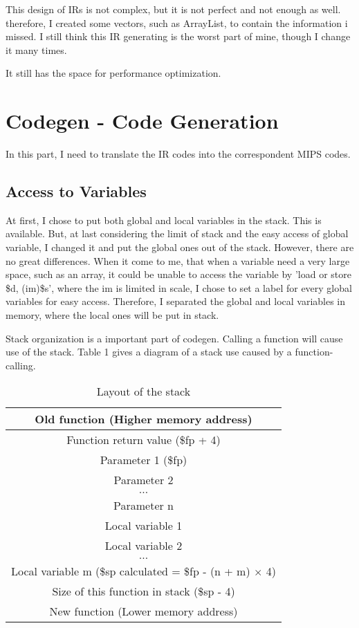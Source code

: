 \documentclass[preprint, 9pt]{sigplanconf}
\begin{document}
    This design of IRs is not complex, but it is not perfect and not enough as well.
    therefore, I created some vectors, such as ArrayList, to contain the information i missed.
    I still think this IR generating is the worst part of mine, though I change it many times.

    It still has the space for performance optimization.

\section{Codegen - Code Generation}

    In this part, I need to translate the IR codes into the correspondent MIPS codes.

    \subsection{Access to Variables}
    At first, I chose to put both global and local variables in the stack.
    This is available.
    But, at last considering the limit of stack and the easy access of global variable, I changed it and put the global ones out of the stack.
    However, there are no great differences.
    When it come to me, that when a variable need a very large space, such as an array, it could be unable to access the variable by 'load or store \$d, (im)\$s', where the im is limited in scale, I chose to set a label for every global variables for easy access.
    Therefore, I separated the global and local variables in memory, where the local ones will be put in stack.

    Stack organization is a important part of codegen.
    Calling a function will cause use of the stack.
    Table 1 gives a diagram of a stack use caused by a function-calling.

\begin{table}[htbp]
  \centering
  \caption{Layout of the stack}
    \begin{tabular}{c}
    \hline
    Old function (Higher memory address) \\
    \hline\hline
    Function return value (\$fp + 4) \\
    \hline
    Parameter 1 (\$fp) \\
    Parameter 2 \\
    $\dots $ \\
    Parameter n \\
    \hline
    Local variable 1 \\
    Local variable 2 \\
    $\dots$ \\
    Local variable m (\$sp calculated = \$fp - (n + m) $\times$ 4) \\
    \hline
    Size of this function in stack (\$sp - 4) \\
    \hline
    \hline
    New function (Lower memory address) \\
    \hline
    \end{tabular}%
  \label{tab:addlabel}%
\end{table}%
\end{document}
